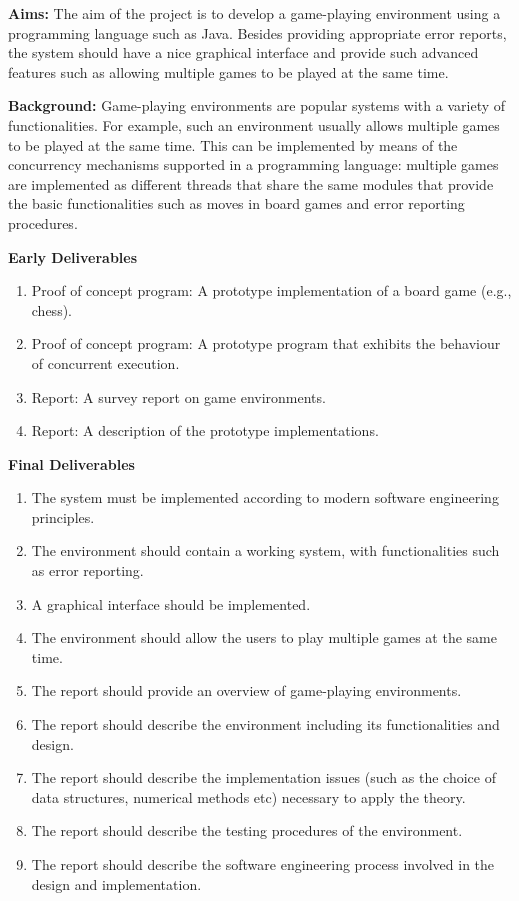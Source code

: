 \documentclass[]{project_interim}
\begin{document}
\textbf{Aims:} The aim of the project is to develop a game-playing environment
using a programming language such as Java. Besides providing appropriate error reports,
the system should have a nice graphical interface and provide such advanced
features such as allowing multiple games to be played at the same time.

\textbf{Background:} Game-playing environments are popular systems with a
variety of functionalities. For example, such an environment usually allows
multiple games to be played at the same time. This can be implemented by means
of the concurrency mechanisms supported in a programming language: multiple games
are implemented as different threads that share the same modules that provide
the basic functionalities such as moves in board games and error reporting procedures.

\textbf{Early Deliverables}
\begin{enumerate}
  \item Proof of concept program: A prototype implementation of a board game (e.g., chess).
  \item Proof of concept program: A prototype program that exhibits the behaviour of concurrent execution.
  \item Report: A survey report on game environments.
  \item Report: A description of the prototype implementations.
\end{enumerate}

\textbf{Final Deliverables}
\begin{enumerate}
  \item The system must be implemented according to modern software engineering principles.
  \item The environment should contain a working system, with functionalities such as error reporting.
  \item A graphical interface should be implemented.
  \item The environment should allow the users to play multiple games at the same time.
  \item The report should provide an overview of game-playing environments.
  \item The report should describe the environment including its functionalities and design.
  \item The report should describe the implementation issues (such as the choice of data structures, numerical methods etc) necessary to apply the theory.
  \item The report should describe the testing procedures of the environment.
  \item The report should describe the software engineering process involved in the design and implementation.
\end{enumerate}
\end{document}
